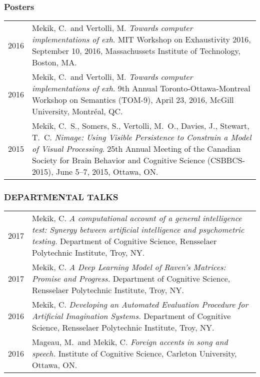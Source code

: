 \documentclass[12pt, letterpaper]{article}
\begin{document}
\subsubsection*{Posters}

\begin{longtable}{p{}p{}}
2016 & \noindent\hangindent=1cm Mekik, C.\ and Vertolli, M. \emph{Towards computer implementations of exh}. MIT Workshop on Exhaustivity 2016, September 10, 2016, Massachussets Institute of Technology, Boston, MA.\\

2016 & \noindent\hangindent=1cm Mekik, C.\ and Vertolli, M. \emph{Towards computer implementations of exh}. 9th Annual Toronto-Ottawa-Montreal Workshop on Semantics (TOM-9), April 23, 2016, McGill University, Montréal, QC.\\

2015 & \noindent\hangindent=1cm Mekik, C.\ S., Somers, S., Vertolli, M.\ O., Davies, J., Stewart, T.\ C. \emph{Nimage: Using Visible Persistence to Constrain a Model of Visual Processing}. 25th Annual Meeting of the Canadian Society for Brain Behavior and Cognitive Science (CSBBCS-2015), June 5--7, 2015, Ottawa, ON. \\
\end{longtable}

\subsubsection*{DEPARTMENTAL TALKS}
\begin{longtable}{p{}p{}}
2017&\noindent\hangindent=1cm Mekik, C. \emph{A computational account of a general intelligence test: Synergy between artificial intelligence and psychometric testing.} Department of Cognitive Science, Rensselaer Polytechnic Institute, Troy, NY.\\

2017&\noindent\hangindent=1cm Mekik, C. \emph{A Deep Learning Model of Raven's Matrices: Promise and Progress.} Department of Cognitive Science, Rensselaer Polytechnic Institute, Troy, NY.\\

2016&\noindent\hangindent=1cm Mekik, C. \emph{Developing an Automated Evaluation Procedure for Artificial Imagination Systems.} Department of Cognitive Science, Rensselaer Polytechnic Institute, Troy, NY.\\

2016&\noindent\hangindent=1cm Mageau, M.\ and Mekik, C. \emph{Foreign accents in song and speech.} Institute of Cognitive Science, Carleton University, Ottawa, ON.
\end{longtable}
\end{document}
